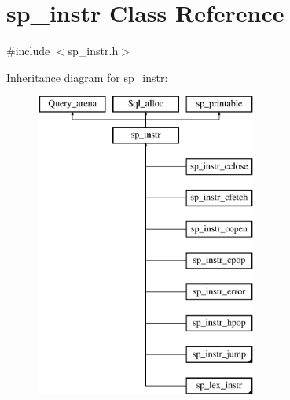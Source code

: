 \hypertarget{classsp__instr}{}\section{sp\+\_\+instr Class Reference}
\label{classsp__instr}


{\ttfamily \#include $<$sp\+\_\+instr.\+h$>$}

Inheritance diagram for sp\+\_\+instr\+:\begin{figure}[H]
\begin{center}
\leavevmode
\includegraphics[height=10.000000cm]{classsp__instr}
\end{center}
\end{figure}
